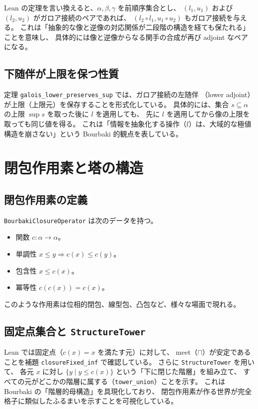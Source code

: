 \documentclass[a4paper]{ltjsarticle}
\theoremstyle{definition}
\theoremstyle{plain}
\theoremstyle{remark}
\begin{document}
Lean の定理を言い換えると、$\alpha, \beta, \gamma$ を前順序集合とし、
$(l_1, u_1)$ および $(l_2, u_2)$ がガロア接続のペアであれば、
$(l_2 \circ l_1, u_1 \circ u_2)$ もガロア接続を与える。
これは「抽象的な像と逆像の対応関係が二段階の構造を経ても保たれる」ことを意味し、
具体的には像と逆像からなる関手の合成が再び adjoint なペアになる。

\subsection{下随伴が上限を保つ性質}
定理 \texttt{galois\_lower\_preserves\_sup} では、ガロア接続の左随伴
（lower adjoint）が上限（上限元）を保存することを形式化している。
具体的には、集合 $s \subseteq \alpha$ の上限 $\sup s$ を取った後に $l$ を適用しても、
先に $l$ を適用してから像の上限を取っても同じ値を得る。
これは「情報を抽象化する操作（$l$）は、大域的な極値構造を崩さない」という
Bourbaki 的観点を表している。

\section{閉包作用素と塔の構造}
\subsection{閉包作用素の定義}
\texttt{BourbakiClosureOperator} は次のデータを持つ。
\begin{itemize}[nosep]
  \item 関数 $c\colon \alpha \to \alpha$。
  \item 単調性 $x \le y \Rightarrow c(x) \le c(y)$。
  \item 包含性 $x \le c(x)$。
  \item 冪等性 $c(c(x)) = c(x)$。
\end{itemize}
このような作用素は位相的閉包、線型包、凸包など、様々な場面で現れる。

\subsection{固定点集合と \texttt{StructureTower}}
Lean では固定点（$c(x) = x$ を満たす元）に対して、
meet（$\sqcap$）が安定であることを補題 \texttt{closureFixed\_inf} で確認している。
さらに \texttt{StructureTower} を用いて、
各元 $x$ に対し $\{y \mid y \le c(x)\}$ という「下に閉じた階層」を組み立て、
すべての元がどこかの階層に属する（\texttt{tower\_union}）ことを示す。
これは Bourbaki の「階層的母構造」を具現化しており、
閉包作用素が作る世界が完全格子に類似したふるまいを示すことを可視化している。
\end{document}

